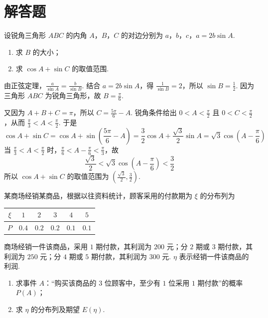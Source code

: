 \section{解答题}

\begin{problem}
设锐角三角形 \(ABC\) 的内角 \(A\)，\(B\)，\(C\) 的对边分别为 \(a\)，\(b\)，\(c\)，\(a = 2b\sin A\).

\begin{enumerate}
\item 求 \(B\) 的大小；
\item 求 \(\cos A + \sin C\) 的取值范围.
\end{enumerate}
\end{problem}

\begin{solution}
由正弦定理，\(\frac{a}{\sin A}=\frac{b}{\sin B}\). 结合 \(a=2b\sin A\)，得 \(\frac{1}{\sin B}=2\)，所以 \(\sin B=\frac12\). 因为三角形 \(ABC\) 为锐角三角形，故 \(B=\frac\pi6\).

又因为 \(A+B+C=\pi\)，所以 \(C=\frac{5\pi}{6}-A\). 锐角条件给出 \(0<A<\frac\pi2\) 且 \(0<C<\frac\pi2\)，从而 \(\frac\pi3<A<\frac\pi2\). 于是
\[
\cos A+\sin C=\cos A+\sin\left(\frac{5\pi}{6}-A\right)=\frac32\cos A+\frac{\sqrt3}{2}\sin A=\sqrt3\cos\left(A-\frac\pi6\right)
\]
当 \(\frac\pi3<A<\frac\pi2\) 时，\(\frac\pi6<A-\frac\pi6<\frac\pi3\)，故
\[
\frac{\sqrt3}{2}<\sqrt3\cos\left(A-\frac\pi6\right)<\frac32
\]
所以 \(\cos A+\sin C\) 的取值范围为 \(\left(\frac{\sqrt3}{2},\frac32\right)\).
\end{solution}

\begin{problem}
某商场经销某商品，根据以往资料统计，顾客采用的付款期为 \(\xi\) 的分布列为

\begin{center}
\small
\begin{tabular}{|c|c|c|c|c|c|}
\hline
\(\xi\) & \(1\) & \(2\) & \(3\) & \(4\) & \(5\) \\
\hline
\(P\) & \(0.4\) & \(0.2\) & \(0.2\) & \(0.1\) & \(0.1\) \\
\hline
\end{tabular}
\end{center}

商场经销一件该商品，采用 \(1\) 期付款，其利润为 \(200\) 元；分 \(2\) 期或 \(3\) 期付款，其利润为 \(250\) 元；分 \(4\) 期或 \(5\) 期付款，其利润为 \(300\) 元. \(\eta\) 表示经销一件该商品的利润.

\begin{enumerate}
\item 求事件 \(A\)：“购买该商品的 \(3\) 位顾客中，至少有 \(1\) 位采用 \(1\) 期付款”的概率 \(P(A)\)；
\item 求 \(\eta\) 的分布列及期望 \(E(\eta)\).
\end{enumerate}
\end{problem}

